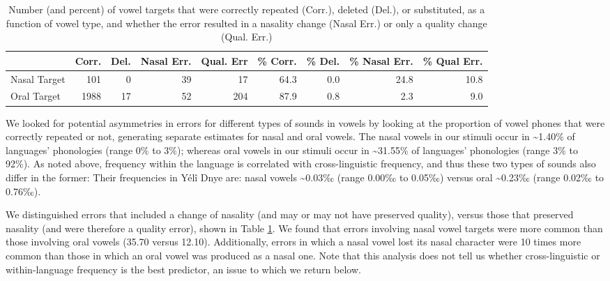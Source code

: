 \documentclass[
  english,
  ,man,floatsintext]{apa6}
\begin{document}
\begin{table}

\caption{\label{tab:tab-v}Number (and percent) of vowel targets that were correctly repeated (Corr.), deleted (Del.), or substituted, as a function of vowel type, and whether the error resulted in a nasality change (Nasal Err.) or only a quality change (Qual. Err.)}
\centering
\begin{tabular}[t]{lrrrrrrrr}
\toprule
  & Corr. & Del. & Nasal Err. & Qual. Err & \% Corr. & \% Del. & \% Nasal Err. & \% Qual Err.\\
\midrule
Nasal Target & 101 & 0 & 39 & 17 & 64.3 & 0.0 & 24.8 & 10.8\\
Oral Target & 1988 & 17 & 52 & 204 & 87.9 & 0.8 & 2.3 & 9.0\\
\bottomrule
\end{tabular}
\end{table}

We looked for potential asymmetries in errors for different types of sounds in vowels by looking at the proportion of vowel phones that were correctly repeated or not, generating separate estimates for nasal and oral vowels. The nasal vowels in our stimuli occur in \textasciitilde1.40\% of languages' phonologies (range 0\% to 3\%);
whereas oral vowels in our stimuli occur in \textasciitilde31.55\% of languages' phonologies (range 3\% to 92\%).
As noted above, frequency within the language is correlated with cross-linguistic frequency, and thus these two types of sounds also differ in the former: Their frequencies in Yélî Dnye are: nasal vowels \textasciitilde0.03‰ (range 0.00‰ to 0.05‰) versus oral \textasciitilde0.23‰ (range 0.02‰ to 0.76‰).

We distinguished errors that included a change of nasality (and may or may not have preserved quality), versus those that preserved nasality (and were therefore a quality error), shown in Table \ref{tab:tab-v}. We found that errors involving nasal vowel targets were more common than those involving oral vowels (35.70 versus 12.10). Additionally, errors in which a nasal vowel lost its nasal character were 10 times more common than those in which an oral vowel was produced as a nasal one. Note that this analysis does not tell us whether cross-linguistic or within-language frequency is the best predictor, an issue to which we return below.
\end{document}
